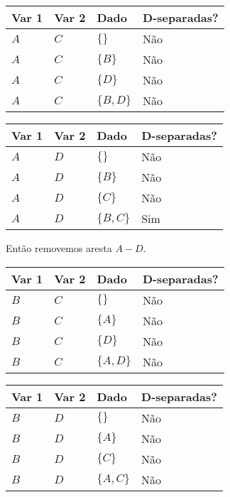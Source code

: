 \documentclass[paper=a4, fontsize=11pt]{scrartcl} %
\numberwithin{equation}{subsection}
\numberwithin{figure}{subsection}
\numberwithin{table}{subsection}
\numberwithin{definition}{subsection}
\numberwithin{theorem}{subsection}
\numberwithin{property}{subsection}
\numberwithin{proposition}{subsection}
\numberwithin{equation}{section}
\numberwithin{figure}{section}
\numberwithin{table}{section}
\numberwithin{definition}{section}
\numberwithin{theorem}{section}
\numberwithin{property}{section}
\numberwithin{proposition}{section}
\begin{document}
\begin{table}[H]
  \centering
    \begin{tabular}{|l|l|l|l|}
        \hline
        Var 1 & Var 2 & Dado          & D-separadas? \\ \hline
        $A$   & $C$   & $\{ \} $      & Não          \\ 
        $A$   & $C$   & $\{ B \}$     & Não          \\ 
        $A$   & $C$   & $\{ D \}$     & Não          \\ 
        $A$   & $C$   & $\{ B, D \} $ & Não          \\
        \hline
    \end{tabular}
\end{table}




\begin{table}[H]
  \centering
    \begin{tabular}{|l|l|l|l|}
        \hline
        Var 1 & Var 2 & Dado          & D-separadas? \\ \hline
        $A$   & $D$   & $\{ \} $      & Não            \\ 
        $A$   & $D$   & $\{ B \}$     & Não          \\ 
        $A$   & $D$   & $\{ C \}$     & Não          \\ 
        $A$   & $D$   & $\{ B, C \} $ & Sim       \\
        \hline
    \end{tabular}
\end{table}

Então removemos aresta $A-D$.



\begin{table}[H]
  \centering
    \begin{tabular}{|l|l|l|l|}
        \hline
        Var 1 & Var 2 & Dado          & D-separadas? \\ \hline
        $B$   & $C$   & $\{ \} $      & Não       \\ 
        $B$   & $C$   & $\{ A \}$     & Não      \\ 
        $B$   & $C$   & $\{ D \}$     & Não          \\ 
        $B$   & $C$   & $\{ A, D \} $ & Não     \\
        \hline
    \end{tabular}
\end{table}

\begin{table}[H]
  \centering
    \begin{tabular}{|l|l|l|l|}
        \hline
        Var 1 & Var 2 & Dado          & D-separadas? \\ \hline
        $B$   & $D$   & $\{ \} $      & Não       \\ 
        $B$   & $D$   & $\{ A \}$     & Não      \\ 
        $B$   & $D$   & $\{ C \}$     & Não          \\ 
        $B$   & $D$   & $\{ A, C \} $ & Não     \\
        \hline
    \end{tabular}
\end{table}
\end{document}
